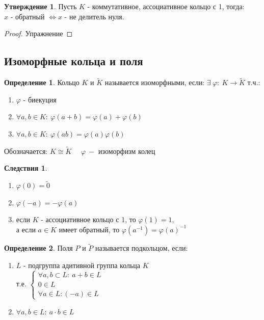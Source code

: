 \documentclass[a4paper, 12pt]{article}
\renewcommand{\phi}{\varphi}
\newcommand\tab[1][.5cm]{\hspace*{#1}}
\theoremstyle{definition}
\newtheorem*{definition}{Определение}
\newtheorem*{consequenses}{Следствия}
\newtheorem*{subtheorem}{Утверждение}
\begin{document}
  \begin{subtheorem}
    Пусть $K$ - коммутативное, ассоциативное кольцо с 1, тогда:\\ $x$ - обратный $\Longleftrightarrow x$ - не делитель нуля.  
  \end{subtheorem} 
  \begin{proof}
    Упражнение
  \end{proof}
  \subsection{Изоморфные кольца и поля}
  \begin{definition}
    Кольцо $K$ и $\widetilde{K}$ называется изоморфными, если: 
    $\exists \ \phi: \ K \to \widetilde{K}$ т.ч.:
    \begin{enumerate}
      \item $\phi$ - биекуция
      \item $\forall a, b \in K: \ \phi(a+b) = \phi(a)+\phi(b)$
      \item $\forall a, b \in K: \ \phi(ab) = \phi(a)\phi(b)$ 
    \end{enumerate}
    Обозначается: $K\cong \widetilde{K}$ \ \ $\phi \ - $ изоморфизм колец 
  \end{definition} 
  \begin{consequenses}\tab
    \begin{enumerate}
      \item $\phi(0) = \widetilde{0}$
      \item $\phi(-a) = -\phi(a)$
      \item если $K$ - ассоциативное кольцо с 1, то $\phi(1) = 1$, \\а если $a \in K$ имеет обратный, то $\phi(a^{-1}) = \phi(a)^{-1}$    
    \end{enumerate}
  \end{consequenses} 
  \begin{definition}
    Поля $P$ и $\widetilde{P}$ называется подкольцом, если:
    \begin{enumerate}
      \item $L$ - подгруппа адитивной группа кольца $K$\\
      т.е. $\begin{cases}
        \forall a, b \subset L : \ a + b \in L \\
        0 \in L \\
        \forall a \in L: (-a) \in L
      \end{cases}$
      \item $\forall a, b \in L: \ a \cdot b \in L$    
    \end{enumerate}
  \end{definition} 
\end{document}
